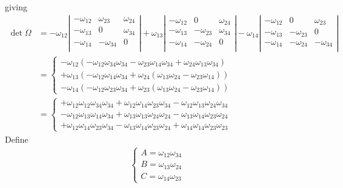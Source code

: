 giving
\begin{align}
\det{\Omega} &=-\omega_{12}\left|\begin{array}{lll} -\omega_{12}&\omega_{23}&\omega_{24}\\
-\omega_{13}&0&\omega_{34}\\
-\omega_{14}&-\omega_{34}&0\\
\end{array}\right|+\omega_{13}\left|\begin{array}{lll} -\omega_{12}&0&\omega_{24}\\
-\omega_{13}&-\omega_{23}&\omega_{34}\\
-\omega_{14}&-\omega_{24}&0\\
\end{array}\right|-\omega_{14}\left|\begin{array}{lll} -\omega_{12}&0&\omega_{23}\\
-\omega_{13}&-\omega_{23}&0\\
-\omega_{14}&-\omega_{24}&-\omega_{34}\\
\end{array}\right|\\
&= \left\{\begin{array}{l}-\omega_{12}\left( -\omega_{12}\omega_{34}\omega_{34}-\omega_{23}\omega_{14}\omega_{34}+\omega_{24}\omega_{13}\omega_{34} \right)\\
+\omega_{13}\left(- \omega_{12}\omega_{14}\omega_{34} +\omega_{24}\left( \omega_{13}\omega_{24}-\omega_{23}\omega_{14}\right)\right)\\
-\omega_{14}\left(- \omega_{12}\omega_{23}\omega_{34} +\omega_{23}\left( \omega_{13}\omega_{24}-\omega_{23}\omega_{14}\right)\right)\end{array}\right.\\
&= \left\{\begin{array}{l}+\omega_{12}\omega_{12}\omega_{34}\omega_{34}+\omega_{12}\omega_{14}\omega_{23}\omega_{34}-\omega_{12}\omega_{13}\omega_{24}\omega_{34} \\
- \omega_{12}\omega_{13}\omega_{14}\omega_{34} + \omega_{13}\omega_{13}\omega_{24}\omega_{24}-\omega_{13}\omega_{14}\omega_{23}\omega_{24}\\
+ \omega_{12}\omega_{14}\omega_{23}\omega_{34} - \omega_{13}\omega_{14}\omega_{23}\omega_{24}+\omega_{14}\omega_{14}\omega_{23}\omega_{23}\end{array}\right.
\end{align}
Define
\begin{align}
\left\{\begin{array}{l}
A= \omega_{12}\omega_{34}\\
B=\omega_{13}\omega_{24}\\
C=\omega_{14}\omega_{23}
\end{array}\right.
\end{align}
